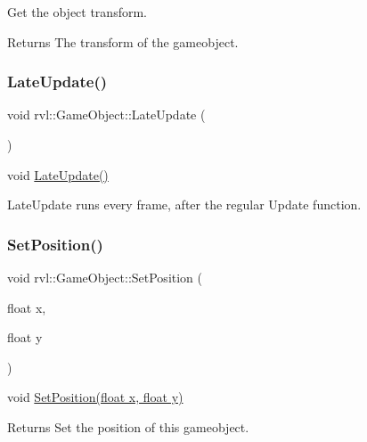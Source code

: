 Get the object transform. 

\begin{DoxyReturn}{Returns}
The transform of the gameobject. 
\end{DoxyReturn}
\mbox{\label{classrvl_1_1_game_object_a81751a7dfa6c0210449aa66fb731807c}} 
\subsubsection{\texorpdfstring{Late\+Update()}{LateUpdate()}}
{\footnotesize\ttfamily void rvl\+::\+Game\+Object\+::\+Late\+Update (\begin{DoxyParamCaption}{ }\end{DoxyParamCaption})}



void \hyperlink{classrvl_1_1_game_object_a81751a7dfa6c0210449aa66fb731807c}{Late\+Update()} 

Late\+Update runs every frame, after the regular Update function. \mbox{\label{classrvl_1_1_game_object_afdf86fa461d382882b91d97b028d0de2}} 
\subsubsection{\texorpdfstring{Set\+Position()}{SetPosition()}}
{\footnotesize\ttfamily void rvl\+::\+Game\+Object\+::\+Set\+Position (\begin{DoxyParamCaption}\item[{float}]{x,  }\item[{float}]{y }\end{DoxyParamCaption})}



void \hyperlink{classrvl_1_1_game_object_afdf86fa461d382882b91d97b028d0de2}{Set\+Position(float x, float y)} 

\begin{DoxyReturn}{Returns}
Set the position of this gameobject. 
\end{DoxyReturn}
\mbox{\label{classrvl_1_1_game_object_a3d0364d2a33aaadb0a00e530bd7d54c3}} 
